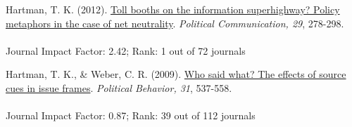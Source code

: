 \documentclass[12pt]{article}
\newcommand{\halfblankline}{\quad\vspace{-0.5\baselineskip}\pagebreak[3]}
\begin{document}
\begin{bibenum}
    \item {Hartman, T. K.} (2012). 
          \href{http://tkhartman.staff.shef.ac.uk/_content/documents//Hartman.2012.Political.Communication.pdf}
          {Toll booths on the information superhighway? 
          Policy metaphors in the case of net neutrality}. 
          \emph{Political Communication, 29}, 278-298.\\
          \\
          Journal Impact Factor: 2.42; Rank: 1 out of 72 journals

    \item {Hartman, T. K.}, \& Weber, C. R. (2009). 
          \href{http://tkhartman.staff.shef.ac.uk/_content/documents//Hartman.Weber.2009.Political.Behavior.pdf}
          {Who said what? The effects of source cues in issue frames}. 
          \emph{Political Behavior, 31}, 537-558.\\		
          \\
          Journal Impact Factor: 0.87; Rank: 39 out of 112 journals
\end{bibenum}

\halfblankline
\end{document}
